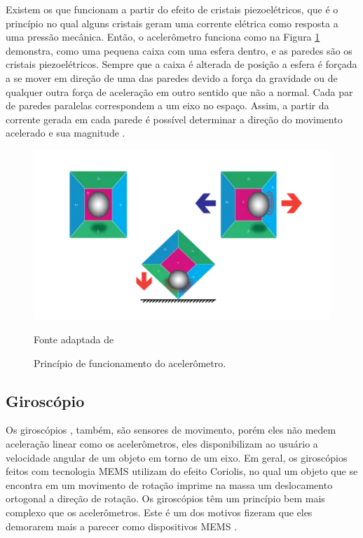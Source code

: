 				Existem os que funcionam a partir do efeito de cristais piezoelétricos, que é o princípio no qual alguns cristais geram uma corrente elétrica como resposta a uma pressão mecânica. Então, o acelerômetro  funciona como na Figura \ref{acel} demonstra, como uma pequena caixa com uma esfera dentro, e as paredes são os cristais piezoelétricos.  Sempre que a caixa é alterada de posição a esfera é forçada a se mover em direção de uma das paredes devido a força da gravidade ou de qualquer outra força de aceleração em outro sentido que não a normal. Cada par de paredes paralelas correspondem a um eixo no espaço. Assim, a partir da corrente gerada em cada parede é possível determinar a direção do movimento acelerado e sua magnitude \cite{Sanjeev2018}.
				
				\begin{figure}[h]
					\centering
					\includegraphics[keepaspectratio=true,scale=0.8
					]{figuras/acelerometro.PNG}
					\caption{Princípio de funcionamento do acelerômetro.}
					Fonte adaptada de \cite{Sanjeev2018}
					\label{acel}
				\end{figure}
	
		\subsection{Giroscópio}
			
			Os giroscópios , também, são sensores de movimento, porém eles não medem aceleração linear como os acelerômetros, eles disponibilizam ao usuário a velocidade angular de um objeto em torno de um eixo. Em geral, os giroscópios feitos com tecnologia MEMS utilizam do efeito Coriolis, no qual um objeto que se encontra em um movimento de rotação imprime na massa um deslocamento ortogonal a direção de rotação. Os giroscópios têm um princípio bem mais complexo que os acelerômetros. Este é um dos motivos fizeram que eles demorarem mais a parecer como dispositivos MEMS \cite{almeida2014}.
			
